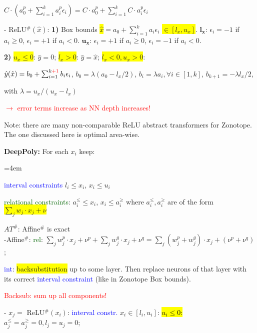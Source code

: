 \documentclass[11pt,landscape,a4paper,fleqn]{article}
\newcommand{\mhl}[1]{\setlength{\fboxsep}{0pt}\colorbox{yellow}{#1}}
\begin{document}
\begin{multicols*}{4}
$C \cdot (a_0^p + \sum_{i=1}^{k} a_i^p \epsilon_i) = C \cdot a_0^p + \sum_{i=1}^{k} C \cdot a_i^p \epsilon_i$

- ReLU$^\#(\hat{x})$: \textbf{1)} Box bounds \mhl{$\hat{x}$}$ = a_0 + \sum_{i=1}^{k} a_i\epsilon_i$ \mhl{$\in [l_x,u_x]$}. $\mathbf{l_x}$: $\epsilon_i = -1$ if $a_i \geq 0$, $\epsilon_i = +1$ if $a_i < 0$. $\mathbf{u_x}$: $\epsilon_i = +1$ if $a_i \geq 0$, $\epsilon_i = -1$ if $a_i < 0$.

\textbf{2)} \mhl{$u_x \leq 0$}: $\hat{y} = 0$; \mhl{$l_x > 0$}: $\hat{y} = \hat{x}$; \mhl{$l_x < 0, u_x > 0$}:

$\hat{y}(\hat{x}) = b_0 + \sum_{i=1}^{k\textcolor{red}{+1}} b_i \epsilon_i$, $b_0 = \lambda(a_0 - l_x/2)$, $b_i = \lambda a_i, \forall i \in [1,k]$, $b_{k+1} = -\lambda l_x / 2$,

with $\lambda = u_x / (u_x - l_x)$

\textcolor{red}{$\rightarrow$ error terms increase as NN depth increases!}

Note: there are many non-comparable ReLU abstract transformers for Zonotope. The one discussed here is optimal area-wise.
\vspace*{1mm}

\textbf{DeepPoly:} For each $x_i$ keep:

\begin{compactitem}=4em
	\item \textcolor{blue}{interval constraints} $l_i \leq x_i$, $x_i \leq u_i$
	\item \textcolor{darkgreen}{relational constraints}: $a_i^\leq \leq x_i$, $x_i \leq a_i^\geq$ where $a_i^\leq, a_i^\geq$ are of the form \mhl{$\sum_j w_j \cdot x_j + \nu$}
\end{compactitem}
\vspace*{1mm}

$AT^\#$: Affine$^\#$ is exact\\
-Affine$^\#$: \textcolor{darkgreen}{rel}: $\sum_j w_j^p \cdot x_j + \nu^p + \sum_j w_j^q \cdot x_j + \nu^q = \sum_j (w_j^p + w_j^q) \cdot x_j + (\nu^p + \nu^q)$;

\textcolor{blue}{int}: \mhl{backsubstitution} up to some layer. Then replace neurons of that layer with its correct \textcolor{blue}{interval constraint} (like in Zonotope Box bounds).

\textcolor{red}{Backsub: sum up all components!}

- $x_j =$ ReLU$^\#(x_i)$: \textcolor{blue}{interval constr.} $x_i \in [l_i, u_i]$:
\hl{$u_i \leq 0$:} $a_j^\leq = a_j^\geq = 0, l_j = u_j = 0$;


\end{multicols*}
\end{document}
